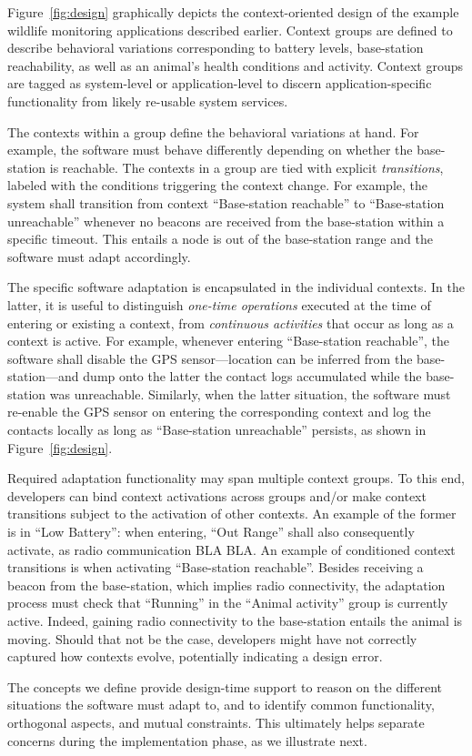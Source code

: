 Figure~\ref{fig:design} graphically depicts the context-oriented
design of the example wildlife monitoring applications described
earlier. Context groups are defined to describe behavioral variations
corresponding to battery levels, base-station reachability, as well as
an animal's health conditions and activity. Context groups are tagged
as system-level or application-level to discern application-specific
functionality from likely re-usable system services.

The contexts within a group define the behavioral variations at
hand. For example, the software must behave differently depending on
whether the base-station is reachable.  The contexts in a group are
tied with explicit \emph{transitions}, labeled with the conditions
triggering the context change. For example, the system shall
transition from context ``Base-station reachable'' to ``Base-station
unreachable'' whenever no beacons are received from the base-station
within a specific timeout. This entails a node is out of the
base-station range and the software must adapt accordingly.

The specific software adaptation is encapsulated in the individual
contexts. In the latter, it is useful to distinguish \emph{one-time
  operations} executed at the time of entering or existing a context,
from \emph{continuous activities} that occur as long as a context is
active. For example, whenever entering ``Base-station reachable'', the
software shall disable the GPS sensor---location can be inferred from
the base-station---and dump onto the latter the contact logs
accumulated while the base-station was unreachable. Similarly, when
the latter situation, the software must re-enable the GPS sensor on
entering the corresponding context and log the contacts locally as
long as ``Base-station unreachable'' persists, as shown in
Figure~\ref{fig:design}.

Required adaptation functionality may span multiple context groups. To
this end, developers can bind context activations across groups and/or
make context transitions subject to the activation of other
contexts. An example of the former is in ``Low Battery'': when
entering, ``Out Range'' shall also consequently activate, as radio
communication BLA BLA. An
example of conditioned context transitions is when activating
``Base-station reachable''. Besides receiving a beacon from the
base-station, which implies radio connectivity, the adaptation process
must check that ``Running'' in the ``Animal activity'' group is
currently active. Indeed, gaining radio connectivity to the
base-station entails the animal is moving. Should that not be the
case, developers might have not correctly captured how contexts
evolve, potentially indicating a design error.

The concepts we define provide design-time support to reason on the
different situations the software must adapt to, and to identify common
functionality, orthogonal aspects, and mutual constraints. This
ultimately helps separate concerns during the implementation phase, as
we illustrate next.



